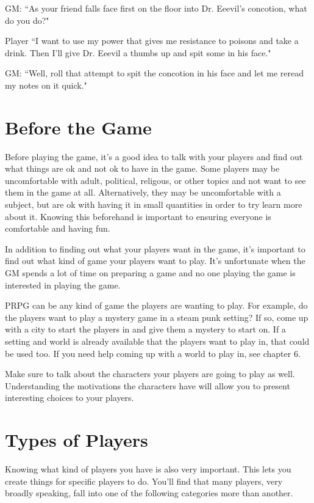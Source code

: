 \begin{flushleft}
GM: ``As your friend falls face first on the floor into Dr. Eeevil's
concotion, what do you do?"

Player ``I want to use my power that gives me resistance to poisons and take a
drink. Then I'll give Dr. Eeevil a thumbs up and spit some in his face."

GM: ``Well, roll that attempt to spit the concotion in his face and let me
reread my notes on it quick."

\section*{Before the Game}

Before playing the game, it's a good idea to talk with your players and find out
what things are ok and not ok to have in the game. Some players may be
uncomfortable with adult, political, religous, or other topics and not want to
see them in the game at all. Alternatively, they may be uncomfortable with a
subject, but are ok with having it in small quantities in order to try learn
more about it. Knowing this beforehand is important to ensuring everyone is
comfortable and having fun.

In addition to finding out what your players want in the game, it's important
to find out what kind of game your players want to play. It's unfortunate when
the GM spends a lot of time on preparing a game and no one playing the game
is interested in playing the game.

PRPG can be any kind of game the players are wanting to play. For example, do
the players want to play a mystery game in a steam punk setting? If so, come up
with a city to start the players in and give them a mystery to start on.
If a setting and world is already available that the players want to play in,
that could be used too. If you need help coming up with a world to play in,
see chapter 6.

Make sure to talk about the characters your players are going to play as well.
Understanding the motivations the characters have will allow you to present
interesting choices to your players.

\section*{Types of Players}

Knowing what kind of players you have is also very important. This lets you
create things for specific players to do. You'll find that many players, very
broadly speaking, fall into one of the following categories more than another.


\end{flushleft}
